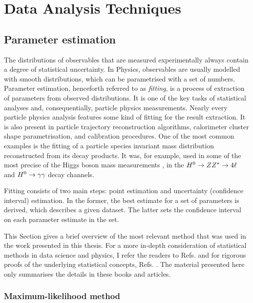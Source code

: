 \chapter{Data Analysis Techniques}\label{ch:analysis_techniques}

\section{Parameter estimation}\label{sec:fitting_theory}

The distributions of observables that are measured experimentally always contain a degree of statistical uncertainty.
In Physics, observables are usually modelled with smooth distributions, which can be parametrised with a set of numbers. 
Parameter estimation, henceforth referred to as \textit{fitting}, is a process of extraction of parameters from observed distributions. 
It is one of the key tasks of statistical analyses and, consequentially, particle physics measurements. 
Nearly every particle physics analysis features some kind of fitting for the result extraction. 
It is also present in particle trajectory reconstruction algorithms, calorimeter cluster shape parametrisation, and calibration procedures.
One of the most common examples is the fitting of a particle species invariant mass distribution reconstructed from its decay products.
It was, for example, used in some of the most precise of the Higgs boson mass measurements \cite{ATLAS:2018tdk,CMS:2020xrn}, in the $H^0\rightarrow ZZ^{*}\rightarrow 4\ell$ and $H^0\rightarrow\gamma\gamma$ decay channels.

Fitting consists of two main steps: point estimation and uncertainty (confidence interval) estimation. 
In the former, the best estimate for a set of parameters is derived, which describes a given dataset.
The latter sets the confidence interval on each parameter estimate in the set. 

This Section gives a brief overview of the most relevant method that was used in the work presented in this thesis. 
For a more in-depth consideration of statistical methods in data science and physics, I refer the readers to Refs. \cite{Behnke:2013pga,Blobel_Lohrmann_1998} and for rigorous proofs of the underlying statistical concepts, Refs. \cite{Bohm:2014vmk,James_2006,Barlow:1990vc}. 
The material presented here only summarises the details in these books and articles.

\subsection{Maximum-likelihood method}\label{sec:mle}

